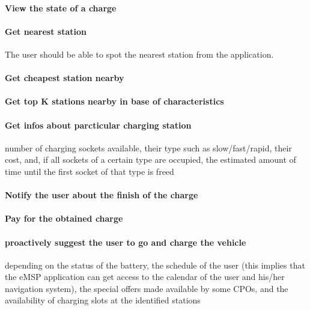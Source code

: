 \paragraph{View the state of a charge}

\paragraph{Get nearest station}
The user should be able to spot the nearest station from the application.

\paragraph{Get cheapest station nearby}

\paragraph{Get top K stations nearby in base of characteristics}
\paragraph{Get infos about parcticular charging station}
number of charging sockets available, their type such as slow/fast/rapid, their cost, and, if all sockets of a certain type are occupied, the estimated amount of time until the first socket of that type is freed

\paragraph{Notify the user about the finish of the charge}

\paragraph{Pay for the obtained charge}

\paragraph{proactively suggest the user to go and charge the vehicle}
depending on the status of the
battery, the schedule of the user (this implies that the eMSP application can get access to the
calendar of the user and his/her navigation system), the special offers made available by some
CPOs, and the availability of charging slots at the identified stations

